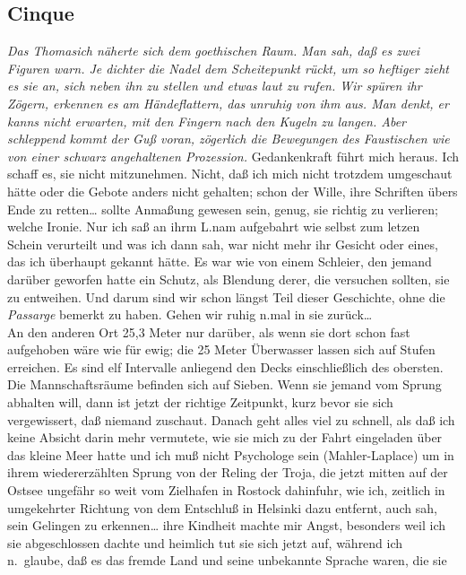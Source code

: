 \documentclass[
]{article}
\author{}
\date{\vspace{-2.5em}}
\begin{document}
\subsection{Cinque}\label{cinque}

\emph{Das Thomasich näherte sich dem goethischen Raum. Man sah, daß es
zwei Figuren warn. Je dichter die Nadel dem Scheitepunkt rückt, um so
heftiger zieht es sie an, sich neben ihn zu stellen und etwas laut zu
rufen. Wir spüren ihr Zögern, erkennen es am Händeflattern, das unruhig
von ihm aus. Man denkt, er kanns nicht erwarten, mit den Fingern nach
den Kugeln zu langen. Aber schleppend kommt der Guß voran, zögerlich die
Bewegungen des Faustischen wie von einer schwarz angehaltenen
Prozession.} Gedankenkraft führt mich heraus. Ich schaff es, sie nicht
mitzunehmen. Nicht, daß ich mich nicht trotzdem umgeschaut hätte oder
die Gebote anders nicht gehalten; schon der Wille, ihre Schriften übers
Ende zu retten\ldots{} sollte Anmaßung gewesen sein, genug, sie richtig
zu verlieren; welche Ironie. Nur ich saß an ihrm L.nam aufgebahrt wie
selbst zum letzen Schein verurteilt und was ich dann sah, war nicht mehr
ihr Gesicht oder eines, das ich überhaupt gekannt hätte. Es war wie von
einem Schleier, den jemand darüber geworfen hatte ein Schutz, als
Blendung derer, die versuchen sollten, sie zu entweihen. Und darum sind
wir schon längst Teil dieser Geschichte, ohne die \emph{Passarge}
bemerkt zu haben. Gehen wir ruhig n.mal in sie zurück\ldots{}\\
An den anderen Ort 25,3 Meter nur darüber, als wenn sie dort schon fast
aufgehoben wäre wie für ewig; die 25 Meter Überwasser lassen sich auf
Stufen erreichen. Es sind elf Intervalle anliegend den Decks
einschließlich des obersten. Die Mannschaftsräume befinden sich auf
Sieben. Wenn sie jemand vom Sprung abhalten will, dann ist jetzt der
richtige Zeitpunkt, kurz bevor sie sich vergewissert, daß niemand
zuschaut. Danach geht alles viel zu schnell, als daß ich keine Absicht
darin mehr vermutete, wie sie mich zu der Fahrt eingeladen über das
kleine Meer hatte und ich muß nicht Psychologe sein (Mahler-Laplace) um
in ihrem wiedererzählten Sprung von der Reling der Troja, die jetzt
mitten auf der Ostsee ungefähr so weit vom Zielhafen in Rostock
dahinfuhr, wie ich, zeitlich in umgekehrter Richtung von dem Entschluß
in Helsinki dazu entfernt, auch sah, sein Gelingen zu erkennen\ldots{}
ihre Kindheit machte mir Angst, besonders weil ich sie abgeschlossen
dachte und heimlich tut sie sich jetzt auf, während ich n.~glaube, daß
es das fremde Land und seine unbekannte Sprache waren, die sie
\end{document}
